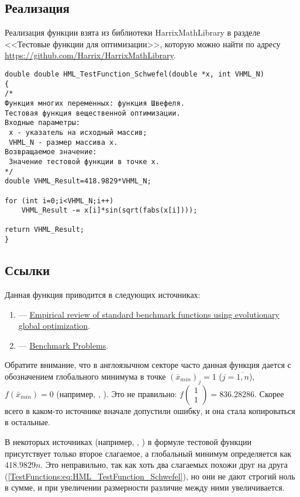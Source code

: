 \subsection {Реализация}

Реализация функции взята из библиотеки HarrixMathLibrary в разделе <<Тестовые функции для оптимизации>>, которую можно найти по адресу \href{https://github.com/Harrix/HarrixMathLibrary} {https://github.com/Harrix/HarrixMathLibrary}.

\begin{lstlisting}[caption=Код функции HML\_TestFunction\_Schwefel]
double double HML_TestFunction_Schwefel(double *x, int VHML_N)
{
/*
Функция многих переменных: функция Швефеля.
Тестовая функция вещественной оптимизации.
Входные параметры:
 x - указатель на исходный массив;
 VHML_N - размер массива x.
Возвращаемое значение:
 Значение тестовой функции в точке x.
*/
double VHML_Result=418.9829*VHML_N;

for (int i=0;i<VHML_N;i++)
    VHML_Result -= x[i]*sin(sqrt(fabs(x[i])));

return VHML_Result;
}
\end{lstlisting}

\subsection {Ссылки}

Данная функция приводится в следующих источниках:

\begin{enumerate}
\item \cite[стр. 9]{web:1207.4318} ---  \href{http://arxiv.org/pdf/1207.4318v1.pdf}{Empirical review of standard benchmark functions using evolutionary global optimization}.
\item \cite{web:www.cs.cmu.edu:BenchmarkProblems} ---  \href{http://www.cs.cmu.edu/afs/cs/project/jair/pub/volume24/ortizboyer05a-html/node6.html}{Benchmark Problems}.
\end{enumerate}

Обратите внимание, что в англоязычном секторе часто данная функция дается с обозначением глобального минимума в точке $\left(\bar{x}_{min} \right)_j=1$ ($j=\overline{1,n}$), $f\left(\bar{x}_{min} \right) =0$ (например, \cite{web:www.sfu.ca:SchwefelFunction}, \cite{web:www-optima.amp.i.kyoto-u.ac.jp:SchwefelFunction}). Это не правильно: $f\left(\begin{matrix}
1 \\ 1
\end{matrix} \right) =836.28286$. Скорее всего в каком-то источнике вначале допустили ошибку, и она стала копироваться в остальные.

В некоторых источниках (например, \cite{web:www.pg.gda.pl:Schwefelsfunction7}, \cite[стр. 7]{web:GEATbxExamples}) в формуле тестовой функции присутствует только второе слагаемое, а глобальный минимум определяется как $ 418.9829 n $. Это неправильно, так как хоть два слагаемых похожи друг на друга (\ref{TestFunctions:eq:HML_TestFunction_Schwefel}), но они не дают строгий ноль в сумме, и при увеличении размерности различие между ними увеличивается.
